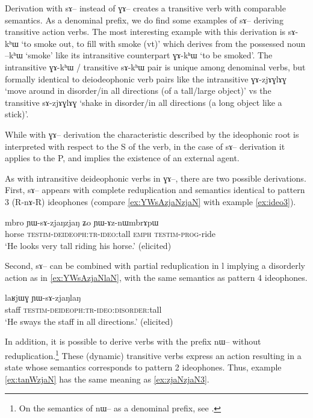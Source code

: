 \documentclass[oldfontcommands,oneside,a4paper,11pt]{article}
\newcommand{\ipa}[1]{{\phon \mbox{#1}}} %
\begin{document}
Derivation with \ipa{sɤ--} instead of \ipa{ɣɤ--} creates a transitive verb with comparable semantics. As a denominal prefix, we do find some examples of \ipa{sɤ--} deriving transitive action verbs. The most interesting example with this derivation is \ipa{sɤ-kʰɯ} `to smoke out, to fill with smoke (vt)' which derives from the possessed noun \ipa{--kʰɯ} `smoke' like its intransitive counterpart \ipa{ɣɤ-kʰɯ} `to be smoked'. The intransitive \ipa{ɣɤ-kʰɯ} / transitive  \ipa{sɤ-kʰɯ} pair  is unique among denominal verbs, but formally identical to deiodeophonic verb pairs like the intransitive \ipa{ɣɤ-zjɤɣlɤɣ} `move around in disorder/in all directions (of a tall/large object)' vs the transitive \ipa{sɤ-zjɤɣlɤɣ} `shake in disorder/in all directions (a long object like a stick)'.

While with   \ipa{ɣɤ--} derivation  the characteristic described by the ideophonic root is interpreted with respect to the S of the verb, in the case of   \ipa{sɤ--} derivation it applies to the P, and implies the existence of an external agent.

As with intransitive deideophonic verbs in \ipa{ɣɤ--}, there are two possible derivations. First, \ipa{sɤ--} appears with complete reduplication and semantics identical to pattern 3 (R-\ipa{nɤ}-R) ideophones (compare \ref{ex:YWsAzjaNzjaN} with example \ref{ex:ideo3}).

     \begin{exe}
     \ex \label{ex:YWsAzjaNzjaN}
\gll
\ipa{mbro} 	\ipa{ɲɯ-sɤ-zjaŋzjaŋ} 	\ipa{ʑo} 	\ipa{ɲɯ-ɤz-nɯmbrɤpɯ} \\
horse \textsc{testim-deideoph:tr-ideo}:tall \textsc{emph} \textsc{testim-prog}-ride \\
\glt  `He looks very tall riding his horse.' (elicited)
\end{exe}

Second,  \ipa{sɤ--}  can be combined with partial reduplication in \ipa{l} implying a disorderly action as in \ref{ex:YWsAzjaNlaN}, with the same semantics as pattern 4 ideophones.

     \begin{exe}
     \ex \label{ex:YWsAzjaNlaN}
\gll
 \ipa{laʁjɯɣ}  	\ipa{ɲɯ-sɤ-zjaŋlaŋ}  \\
  staff \textsc{testim-deideoph:tr-ideo:disorder}:tall \\
  \glt `He sways the staff in all directions.' (elicited)
\end{exe}

In addition, it is possible to derive   verbs with the prefix \ipa{nɯ--} without reduplication.\footnote{On the semantics of \ipa{nɯ--} as a denominal prefix, see \citealt{jacques14antipassive}.} These (dynamic) transitive verbs express an action resulting in a state whose semantics corresponds to  pattern 2 ideophones. Thus, example \ref{ex:tanWzjaN} has the same meaning as \ref{ex:zjaNzjaN3}. 
\end{document}
